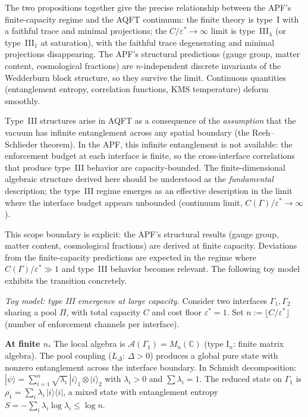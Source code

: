 \documentclass[11pt,a4paper]{article}
\theoremstyle{definition}
\newcommand{\eps}{\varepsilon}
\begin{document}
\noindent The two propositions together give the precise
relationship between the APF's finite-capacity regime and the
AQFT continuum: the finite theory is type~I with a faithful trace
and minimal projections; the $C/\eps^* \to \infty$ limit is
type~III$_\lambda$ (or type~III$_1$ at saturation), with the
faithful trace degenerating and minimal projections disappearing.
The APF's structural predictions (gauge group, matter content,
cosmological fractions) are $n$-independent discrete invariants of the
Wedderburn block structure, so they survive the limit.  Continuous
quantities (entanglement entropy, correlation functions, KMS
temperature) deform smoothly.

Type~III structures arise in AQFT as a consequence of the
\emph{assumption} that the vacuum has infinite entanglement across any
spatial boundary (the Reeh--Schlieder theorem).  In the APF, this
infinite entanglement is not available: the enforcement budget at each
interface is finite, so the cross-interface correlations that produce
type~III behavior are capacity-bounded.  The finite-dimensional
algebraic structure derived here should be understood as the
\emph{fundamental} description; the type~III regime emerges as an
effective description in the limit where the interface budget appears
unbounded (continuum limit, $C(\Gamma) / \eps^* \to \infty$).

This scope boundary is explicit: the APF's structural results (gauge
group, matter content, cosmological fractions) are derived at finite
capacity.  Deviations from the finite-capacity predictions are expected
in the regime where $C(\Gamma) / \eps^* \gg 1$ and type~III behavior
becomes relevant.  The following toy model exhibits the transition
concretely.

\smallskip\noindent\textit{Toy model: type III emergence at large
capacity.}\quad
Consider two interfaces $\Gamma_1, \Gamma_2$ sharing a pool $\Pi$,
with total capacity $C$ and cost floor $\eps^* = 1$.  Set
$n := \lfloor C / \eps^* \rfloor$ (number of enforcement channels per
interface).

\smallskip\noindent\textbf{At finite $n$.}\quad
The local algebra is $\mathcal{A}(\Gamma_1) = M_n(\mathbb{C})$ (type
I$_n$: finite matrix algebra).  The pool coupling ($L_\Delta$:
$\Delta > 0$) produces a global pure state with nonzero entanglement
across the interface boundary.  In Schmidt decomposition:
$|\psi\rangle = \sum_{i=1}^n \sqrt{\lambda_i}\, |i\rangle_1
\otimes |i\rangle_2$ with $\lambda_i > 0$ and $\sum \lambda_i = 1$.
The reduced state on $\Gamma_1$ is
$\rho_1 = \sum_i \lambda_i\, |i\rangle\langle i|$, a mixed state with
entanglement entropy $S = -\sum_i \lambda_i \log \lambda_i \le \log n$.
\end{document}
